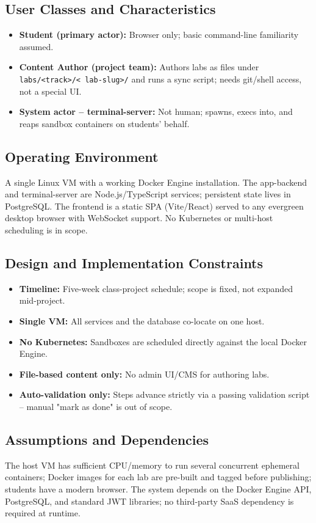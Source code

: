 \documentclass[11pt]{article}
\begin{document}
\subsection{User Classes and Characteristics}
\begin{itemize}
\item \textbf{Student (primary actor):} Browser only; basic
      command-line familiarity assumed.
\item \textbf{Content Author (project team):} Authors labs as files
      under \texttt{labs/\textless track\textgreater/\textless
      lab-slug\textgreater/} and runs a sync script; needs git/shell
      access, not a special UI.
\item \textbf{System actor -- terminal-server:} Not human; spawns,
      execs into, and reaps sandbox containers on students' behalf.
\end{itemize}

\subsection{Operating Environment}
A single Linux VM with a working Docker Engine installation. The
app-backend and terminal-server are Node.js/TypeScript services;
persistent state lives in PostgreSQL. The frontend is a static SPA
(Vite/React) served to any evergreen desktop browser with WebSocket
support. No Kubernetes or multi-host scheduling is in scope.

\subsection{Design and Implementation Constraints}
\begin{itemize}
\item \textbf{Timeline:} Five-week class-project schedule; scope is
      fixed, not expanded mid-project.
\item \textbf{Single VM:} All services and the database co-locate on
      one host.
\item \textbf{No Kubernetes:} Sandboxes are scheduled directly against
      the local Docker Engine.
\item \textbf{File-based content only:} No admin UI/CMS for authoring
      labs.
\item \textbf{Auto-validation only:} Steps advance strictly via a
      passing validation script -- manual "mark as done" is out of
      scope.
\end{itemize}

\subsection{Assumptions and Dependencies}
The host VM has sufficient CPU/memory to run several concurrent
ephemeral containers; Docker images for each lab are pre-built and
tagged before publishing; students have a modern browser. The system
depends on the Docker Engine API, PostgreSQL, and standard JWT
libraries; no third-party SaaS dependency is required at runtime.
\end{document}

